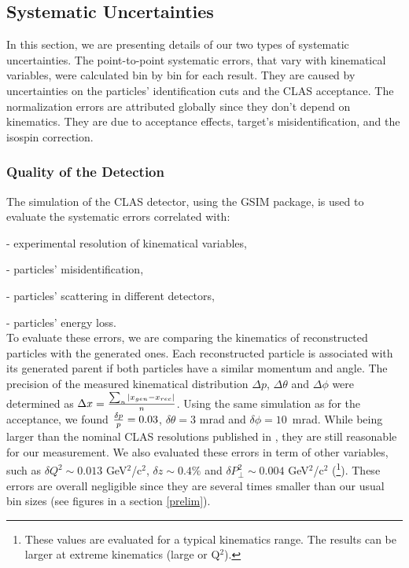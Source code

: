 \subsection{Systematic Uncertainties}
\label{sec:TotSys}

In this section, we are presenting details of our two types of systematic uncertainties. The point-to-point systematic errors, that vary with kinematical variables, were calculated bin by bin for each result. They are caused by uncertainties on the particles' identification cuts and the CLAS acceptance. The normalization errors are attributed globally since they don't depend on kinematics. They are due to acceptance effects, target's misidentification, and the isospin correction.

\subsubsection{Quality of the Detection}
\label{SysId}

The simulation of the CLAS detector, using the GSIM package, is used 
to evaluate the systematic errors correlated with:

  - experimental resolution of kinematical variables,

  - particles' misidentification,

  - particles' scattering in different detectors,

  - particles' energy loss.\\


To evaluate these errors, we are comparing the kinematics of reconstructed 
particles with the generated ones. Each reconstructed particle is associated 
with its generated parent if both particles have a similar momentum and 
angle. The precision of the measured kinematical distribution 
$\Delta p$, $\Delta \theta$ and $\Delta \phi$ were determined as $\Delta x = 
{\sum_n |x_{gen} - x_{rec}| \over n}$. Using the same simulation as for 
the acceptance, we found 
${\delta p \over p } = 0.03$, $\delta \theta = 3$ mrad and $\delta \phi = 
10$~mrad. While being larger than the nominal CLAS resolutions published in 
\cite{Mecking:2003zu}, they are still reasonable for our measurement. We also 
evaluated these errors in term of other variables, such as 
$\delta Q^2 \sim 0.013$ GeV$^2$/c$^2$, $\delta z \sim 0.4 \%$ and $\delta 
P_\perp^2 \sim 0.004$ GeV$^2$/c$^2$ (\footnote{These values are evaluated for 
a typical kinematics range. The results can be larger at extreme kinematics 
(large \pt or Q$^2$).}). These errors are overall negligible since they are 
several times smaller than our usual bin sizes (see figures in a section 
\ref{prelim}). 

